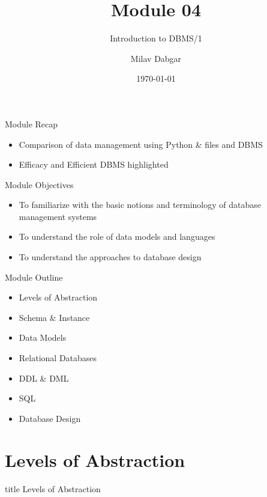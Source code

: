 \documentclass[aspectratio=169, xcolor=dvipsnames]{beamer}
\title{Module 04}
\subtitle{Introduction to DBMS/1}
\author{Milav Dabgar}
\institute{www.milav.in}
\date{\today}
\begin{document}
\begin{frame}
    \titlepage
\end{frame}

\begin{frame}{Module Recap}
    \begin{itemize}
        \item Comparison of data management using Python \& files and DBMS
        \item Efficacy and Efficient DBMS highlighted
    \end{itemize}
\end{frame}

\begin{frame}{Module Objectives}
    \begin{itemize}
        \item To familiarize with the basic notions and terminology of database management systems
        \item To understand the role of data models and languages
        \item To understand the approaches to database design
    \end{itemize}
\end{frame}

\begin{frame}{Module Outline}
    \begin{itemize}[<+->]
        \item Levels of Abstraction
        \item Schema \& Instance
        \item Data Models
        \item Relational Databases
        \item DDL \& DML
        \item SQL
        \item Database Design
    \end{itemize}
\end{frame}

\section{Levels of Abstraction}

\begin{frame}
  \vfill
  \centering
  \begin{beamercolorbox}[sep=8pt,center,shadow=true,rounded=true]{title}
    Levels of Abstraction\par%
  \end{beamercolorbox}
  \vfill
\end{frame}
\end{document}
